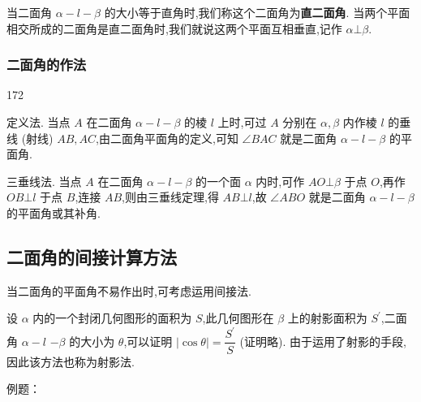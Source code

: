 当二面角 $\alpha  - l - \beta$ 的大小等于直角时,我们称这个二面角为\textbf{直二面角}. 当两个平面相交所成的二面角是直二面角时,我们就说这两个平面互相垂直,记作 $\alpha  \bot  \beta$.

\subsubsection*{二面角的作法}
\begin{dingautolist}{172}
    \item 定义法. 当点 $A$ 在二面角 $\alpha  - l - \beta$ 的棱 $l$ 上时,可过 $A$ 分别在 $\alpha,\beta$ 内作棱 $l$ 的垂线 (射线) ${AB},{AC}$,由二面角平面角的定义,可知 $\angle {BAC}$ 就是二面角 $\alpha  - l - \beta$ 的平面角.
    \item 三垂线法. 当点 $A$ 在二面角 $\alpha  - l - \beta$ 的一个面 $\alpha$ 内时,可作 ${AO}\bot \beta$ 于点 $O$,再作 ${OB} \bot  l$ 于点 $B$,连接 ${AB}$,则由三垂线定理,得 ${AB} \bot  l$,故 $\angle {ABO}$ 就是二面角 $\alpha  - l - \beta$ 的平面角或其补角.
\end{dingautolist}

\subsection*{二面角的间接计算方法}
当二面角的平面角不易作出时,可考虑运用间接法.

设 $\alpha$ 内的一个封闭几何图形的面积为 $S$,此几何图形在 $\beta$ 上的射影面积为 ${S}^{\prime }$,二面角 $\alpha  - l$  $- \beta$ 的大小为 $\theta$,可以证明 $\left| {\cos \theta }\right|  = \dfrac{{S}^{\prime }}{S}$ (证明略). 由于运用了射影的手段,因此该方法也称为射影法.

例题：

